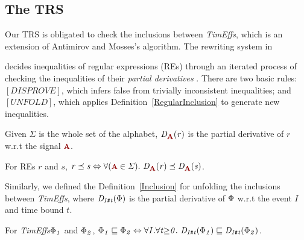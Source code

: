 \documentclass[acmsmall,10pt,review]{acmart}
\newcommand{\timedEffects}{\emph{TimEffs}}
\newcommand{\effect}{\textcolor{black}{\ensuremath{\mathrm{\Phi}}}}
\newcommand{\anyevent}[1]{{\textcolor{darkred}
{{\textbf{\footnotesize #1}}}}}
\newcommand{\code}[1]{{\tt{\ensuremath{\m{#1}}}}}
\newcommand{\CONTAIN}{\sqsubseteq}
\newcommand{\m}{\mathit}
\newcommand{\mysharp}{{\mathrel{\texttt{\#}}}}
\newcommand\tabref[1]{Table \textcolor{black}{\ref{#1}}.}
\newcommand\defref[1]{Definition~\textcolor{blue}{\ref{#1}}}
\begin{document}
\subsection{The TRS}
Our TRS is obligated to check the inclusions between \timedEffects, which is an extension of Antimirov and Mosses's algorithm. The rewriting system in {\cite{antimirov1995rewriting}  
decides inequalities of regular expressions (REs) through an iterated process of checking the inequalities of their \emph{partial derivatives} \cite{antimirov1995partial}. There are two basic rules: 
\code{[DISPROVE]}, which infers false from trivially inconsistent inequalities; and  
\code{[UNFOLD]}, which applies \defref{RegularInclusion} to generate new inequalities.

Given \code{\Sigma} is the whole set of the alphabet, 
\code{D_{\anyevent{A}}(r)} is the partial derivative of \code{r} w.r.t the signal \code{\anyevent{A}}. 

\begin{definition}\label{RegularInclusion}  For REs \code{r} and \code{s}, \code{r \preceq s \Leftrightarrow \forall (\anyevent{A} \in \Sigma).\ D_{\anyevent{A}}(r) \preceq D_{\anyevent{A}}(s)}.
\end{definition}

Similarly, we defined the \defref{Inclusion} for unfolding the inclusions  between \timedEffects, where \code{D_{I\mysharp  t}(\effect)} is the partial derivative of \code{\effect} w.r.t the event \code{I} and time bound \code{t}. 

\begin{definition}[\timedEffects Inclusion]\label{Inclusion}  %
For \timedEffects \code{\effect_1 } and \code{\effect_2}, 
\code{\effect_1  \CONTAIN \effect_2 \Leftrightarrow \forall I. \forall t {\geq} 0.\ D_{I\mysharp  t}(\effect_1)  \CONTAIN D_{I\mysharp  t}(\effect_2)}.
\end{definition}






}
\end{document}

